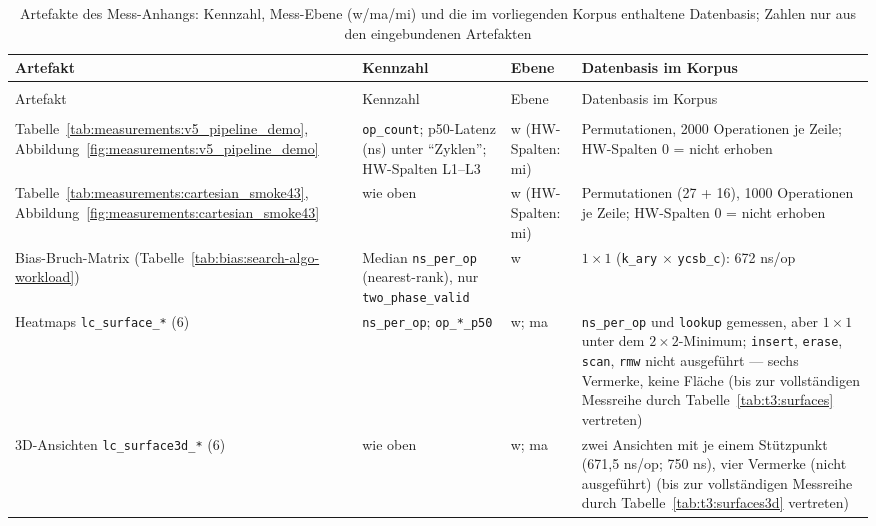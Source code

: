 \begin{footnotesize}
\begin{longtable}{@{}>{\raggedright\arraybackslash}p{4.6cm}>{\raggedright\arraybackslash}p{3.4cm}>{\raggedright\arraybackslash}p{1.1cm}>{\raggedright\arraybackslash}p{5.3cm}@{}}
\caption{Artefakte des Mess-Anhangs: Kennzahl, Mess-Ebene (w/ma/mi) und die im vorliegenden Korpus
enthaltene Datenbasis; Zahlen nur aus den eingebundenen Artefakten}\label{tab:measurements:artefakt-ebenen}\\
\toprule
Artefakt & Kennzahl & Ebene & Datenbasis im Korpus \\
\midrule
\endfirsthead%
\multicolumn{4}{@{}l}{\tablename\ \thetable{} --- Fortsetzung}\\
\toprule
Artefakt & Kennzahl & Ebene & Datenbasis im Korpus \\
\midrule
\endhead%
\midrule
\multicolumn{4}{r@{}}{Fortsetzung nächste Seite}\\
\endfoot%
\bottomrule
\endlastfoot%
Tabelle~\ref{tab:measurements:v5_pipeline_demo}, Abbildung~\ref{fig:measurements:v5_pipeline_demo} & \texttt{op\_count}; p50-Latenz (ns) unter \enquote{Zyklen}; HW-Spalten L1--L3 & w (HW-Spalten: mi) & 6 Permutationen, 2000 Operationen je Zeile; HW-Spalten 0 = nicht erhoben \\
Tabelle~\ref{tab:measurements:cartesian_smoke43}, Abbildung~\ref{fig:measurements:cartesian_smoke43} & wie oben & w (HW-Spalten: mi) & 43 Permutationen (27 + 16), 1000 Operationen je Zeile; HW-Spalten 0 = nicht erhoben \\
Bias-Bruch-Matrix (Tabelle~\ref{tab:bias:search-algo-workload}) & Median \texttt{ns\_per\_op} (nearest-rank), nur \texttt{two\_phase\_valid} & w & $1{\times}1$ (\texttt{k\_ary} $\times$ \texttt{ycsb\_c}): 672 ns/op \\
Heatmaps \texttt{lc\_\allowbreak{}surface\_*} (6) & \texttt{ns\_per\_op}; \texttt{op\_*\_p50} & w; ma &
  \texttt{ns\_per\_op} und \texttt{lookup} gemessen, aber $1{\times}1$ unter dem $2{\times}2$-Minimum;
  \texttt{insert}, \texttt{erase}, \texttt{scan}, \texttt{rmw} nicht ausgeführt --- sechs Vermerke, keine Fläche
  \ifPlatzhalterAlsTabelle{}(bis zur vollständigen Messreihe durch
  Tabelle~\ref{tab:t3:surfaces} vertreten)\fi \\
3D-Ansichten \texttt{lc\_\allowbreak{}surface3d\_*} (6) & wie oben & w; ma & zwei Ansichten mit je einem Stützpunkt
  (671,5 ns/op; 750 ns), vier Vermerke (nicht ausgeführt)
  \ifPlatzhalterAlsTabelle{}(bis zur vollständigen Messreihe durch
  Tabelle~\ref{tab:t3:surfaces3d} vertreten)\fi \\

\end{longtable}
\end{footnotesize}
